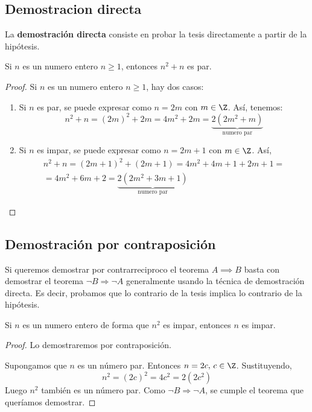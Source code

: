 \subsection{Demostracion directa}
La \textbf{demostración directa} consiste en probar la tesis directamente a partir de la hipótesis.

\begin{theorem}
	Si \(n \) es un numero entero \(n \geq  1\), entonces \(n^{2 } + n \) es par.
\end{theorem}
\begin{proof}
	Si \(n \) es un numero entero \(n \geq  1 \), hay dos casos:
	\begin{enumerate}
		\item Si \(n \) es par, se puede expresar como \(n =2m \) con \(m \in  \Z \). Así, tenemos:
		      \[
			      n^{2} + n = (2m)^{2} + 2m  = 4m^{2} + 2m = \underbrace{2(2m^{2}+m)}_{\text{numero par} }
		      \]
		\item Si \(n \) es impar, se puede expresar como \(n = 2m +1 \) con \(m \in  \Z \). Así,
		      \begin{multline*}
			      n^{2} + n = (2m + 1 )^{2} + (2m+1 ) = 4m^{2} + 4m + 1 + 2m + 1 = \\= 4m^{2} + 6m + 2 = \underbrace{2(2m^{2} + 3m + 1)}_{\text{numero par} }
		      \end{multline*}
	\end{enumerate}
\end{proof}

\subsection{Demostración por contraposición}

Si queremos demostrar por contrarreciproco el teorema \(A \implies B \)  basta con demostrar el teorema \(\neg B \Rightarrow \neg A \) generalmente usando la técnica de demostración directa. Es decir, probamos que lo contrario de la tesis implica lo contrario de la hipótesis.

\begin{theorem}
	Si \(n \) es un numero entero de forma que \(n^{2 } \) es impar, entonces \(n \) es impar.
\end{theorem}
\begin{proof}
	Lo demostraremos por contraposición.

	Supongamos que \(n  \) es un número par. Entonces \(n = 2c, \, c \in \Z\). Sustituyendo,
	\[
		n^{2} = (2c)^{2} = 4c^{2} = 2(2c^{2})
	\]
	Luego \(n^{2} \) también es un número par. Como \(\neg B \Rightarrow \neg A \), se cumple el teorema que queríamos demostrar.
\end{proof}

